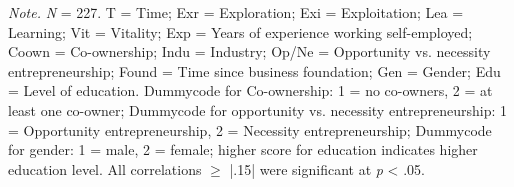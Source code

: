 \documentclass[man, 12pt, a4paper, noextraspace]{apa6}
\begin{document}
\begin{table}
\begin{tabular}{rlllllllllllllll}
\end{tabular}
\smallskip
\begin{tablenotes}
{\small
\textit{Note.} \textit{N} = 227. T = Time; Exr = Exploration; Exi = Exploitation; Lea = Learning; Vit = Vitality; Exp = Years of experience working self-employed; Coown = Co-ownership; Indu = Industry; Op/Ne = Opportunity vs. necessity entrepreneurship; Found = Time since business foundation; Gen = Gender; Edu = Level of education. Dummycode for Co-ownership: 1 = no co-owners, 2 = at least one co-owner; Dummycode for opportunity vs. necessity entrepreneurship: 1 = Opportunity entrepreneurship, 2 = Necessity entrepreneurship; Dummycode for gender: 1 = male, 2 = female; higher score for education indicates higher education level. All correlations $\geq$ |.15| were significant at \textit{p} < .05. 
}
\end{tablenotes}
\end{table}
\end{document}
